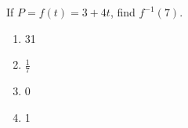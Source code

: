 \bigskip

\item If $P=f(t)=3+4t$, find $f^{-1}(7)$.

\begin{enumerate}
\item 31
\item $\frac{1}{7}$
\item 0
\item 1
\end{enumerate}

